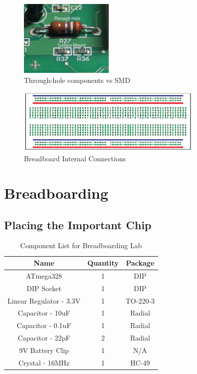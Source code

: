 \documentclass{article}
\begin{document}
\begin{figure}[!h]
    \center
    \includegraphics[width=0.4\textwidth,keepaspectratio]{throughvssmd}
    \caption {Through-hole components vs SMD}
    \label{img:through_vs_smd}
\end{figure}

\begin{figure}[!h]
    \center
    \includegraphics[width=0.8\textwidth,keepaspectratio]{Breadboard_Internal_Connections}
    \caption {Breadboard Internal Connections}
    \label{img:bread_connections}
\end{figure}

\section{Breadboarding}

\subsection{Placing the Important Chip}
\begin{table}[!h]
    \center
    \begin{tabular}{c|c|c}
        Name                    & Quantity & Package   \\
        \hline
        ATmega328               & 1        & DIP       \\
        DIP Socket              & 1        & DIP       \\
        Linear Regulator - 3.3V & 1        & TO-220-3  \\
        Capacitor - 10uF        & 1        & Radial    \\
        Capacitor - 0.1uF       & 1        & Radial    \\
        Capacitor - 22pF        & 2        & Radial    \\
        9V Battery Clip         & 1        & N/A       \\
        Crystal - 16MHz         & 1        & HC-49     
    \end{tabular}
    \caption{Component List for Breadboarding Lab}
    \label{table:componentList}
\end{table}
\end{document}
